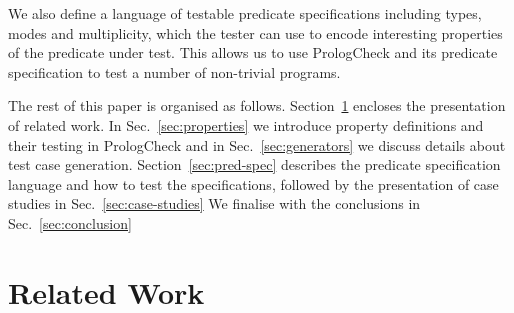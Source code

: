 \documentclass[runningheads,a4paper]{../../PaperStyles/llncs}
\newcommand{\refSec}[1]{Sec.~\ref{#1}}
\newcommand{\refSecI}[1]{Section~\ref{#1}}
\newcommand{\Prolog}[0]{{\sf Prolog}}
\newcommand{\Haskell}[0]{{\sf Haskell}}
\newcommand{\QuickCheck}[0]{{\sf QuickCheck}}
\newcommand{\plqc}[0]{{\sf PrologCheck}}
\begin{document}





We also define a language of testable predicate specifications including
types, modes and multiplicity, which the tester can use to encode
interesting properties of the predicate under test.
%
This allows us to  use \plqc{} and its predicate specification to test a
number of non-trivial programs.




The rest of this paper is organised as follows.
%
\refSecI{sec:rel-work} encloses the presentation of related work.
%
In \refSec{sec:properties} we introduce property definitions and their
testing in \plqc{} and in \refSec{sec:generators} we discuss details
about test case generation.
%
\refSecI{sec:pred-spec} describes the predicate specification language
and how to test the specifications, followed by the presentation of case
studies in \refSec{sec:case-studies}
%
We finalise with the conclusions in \refSec{sec:conclusion}



\section{Related Work} 
\label{sec:rel-work}
\end{document}
